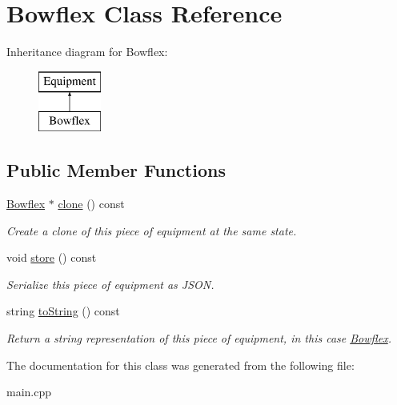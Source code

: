 \hypertarget{class_bowflex}{}\section{Bowflex Class Reference}
\label{class_bowflex}
Inheritance diagram for Bowflex\+:\begin{figure}[H]
\begin{center}
\leavevmode
\includegraphics[height=2.000000cm]{class_bowflex}
\end{center}
\end{figure}
\subsection*{Public Member Functions}
\begin{DoxyCompactItemize}
\item 
\hypertarget{class_bowflex_a6a28e3b55ad31c4cc4df779d7f0377ab}{}\hyperlink{class_bowflex}{Bowflex} $\ast$ \hyperlink{class_bowflex_a6a28e3b55ad31c4cc4df779d7f0377ab}{clone} () const \label{class_bowflex_a6a28e3b55ad31c4cc4df779d7f0377ab}

\begin{DoxyCompactList}\small\item\em Create a clone of this piece of equipment at the same state. \end{DoxyCompactList}\item 
\hypertarget{class_bowflex_aa9b13846ba3101cde05db6f2dfe35218}{}void \hyperlink{class_bowflex_aa9b13846ba3101cde05db6f2dfe35218}{store} () const \label{class_bowflex_aa9b13846ba3101cde05db6f2dfe35218}

\begin{DoxyCompactList}\small\item\em Serialize this piece of equipment as J\+S\+O\+N. \end{DoxyCompactList}\item 
\hypertarget{class_bowflex_aa80bbb6167cbc96a85c4c251f7bd4322}{}string \hyperlink{class_bowflex_aa80bbb6167cbc96a85c4c251f7bd4322}{to\+String} () const \label{class_bowflex_aa80bbb6167cbc96a85c4c251f7bd4322}

\begin{DoxyCompactList}\small\item\em Return a string representation of this piece of equipment, in this case \textquotesingle{}\hyperlink{class_bowflex}{Bowflex}\textquotesingle{}. \end{DoxyCompactList}\end{DoxyCompactItemize}


The documentation for this class was generated from the following file\+:\begin{DoxyCompactItemize}
\item 
main.\+cpp\end{DoxyCompactItemize}
